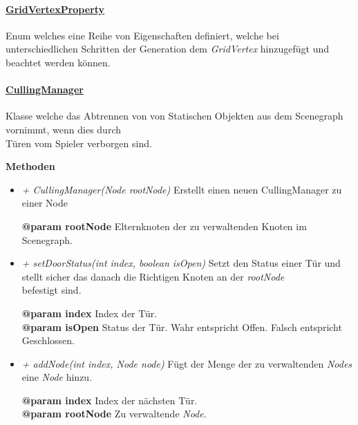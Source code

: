         \paragraph{\underline{GridVertexProperty}} \mbox{}\par
        Enum welches eine Reihe von Eigenschaften definiert, welche bei unterschiedlichen
        Schritten der Generation dem \textit{GridVertex} hinzugefügt und beachtet werden können.\par
        
        \pagebreak

        \paragraph{\underline{CullingManager}} \mbox{}\par
            Klasse welche das Abtrennen von von Statischen Objekten aus dem Scenegraph vornimmt, wenn dies durch\\
            Türen vom Spieler verborgen sind.

            \textbf{Methoden}	
        \begin{itemize}
            \item  \textit{+ CullingManager(Node rootNode)}
                Erstellt einen neuen CullingManager zu einer Node
                \begin{leftbar}[0.9\linewidth]
                    \textbf{@param rootNode} Elternknoten der zu verwaltenden Knoten im Scenegraph.\\
                \end{leftbar}
            \item  \textit{+ setDoorStatus(int index, boolean isOpen)}
                Setzt den Status einer Tür und stellt sicher das danach die Richtigen Knoten an der \textit{rootNode}\\
                befestigt sind.
                \begin{leftbar}[0.9\linewidth]
                    \textbf{@param index} Index der Tür.\\
                    \textbf{@param isOpen} Status der Tür. Wahr entspricht Offen. Falsch entspricht Geschlossen.\\
                \end{leftbar}
            \item  \textit{+ addNode(int index, Node node)}
                Fügt der Menge der zu verwaltenden \textit{Nodes} eine \textit{Node} hinzu.
                \begin{leftbar}[0.9\linewidth]
                    \textbf{@param index} Index der nächsten Tür.\\
                    \textbf{@param rootNode} Zu verwaltende \textit{Node}.\\
                \end{leftbar}
        \end{itemize}